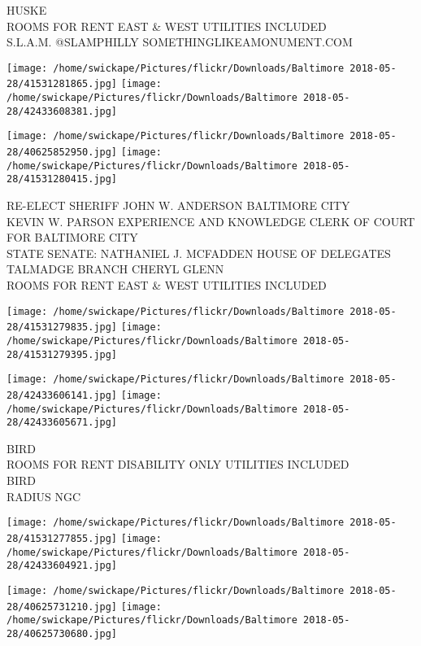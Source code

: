 \documentclass[10pt,letterpaper]{article}
\begin{document}
HUSKE\\
ROOMS FOR RENT EAST \& WEST UTILITIES INCLUDED\\
S.L.A.M. @SLAMPHILLY SOMETHINGLIKEAMONUMENT.COM\\
\pagebreak

\texttt{[image: /home/swickape/Pictures/flickr/Downloads/Baltimore 2018-05-28/41531281865.jpg]}
\texttt{[image: /home/swickape/Pictures/flickr/Downloads/Baltimore 2018-05-28/42433608381.jpg]}

\texttt{[image: /home/swickape/Pictures/flickr/Downloads/Baltimore 2018-05-28/40625852950.jpg]}
\texttt{[image: /home/swickape/Pictures/flickr/Downloads/Baltimore 2018-05-28/41531280415.jpg]}

RE{-}ELECT SHERIFF JOHN W. ANDERSON BALTIMORE CITY\\
KEVIN W. PARSON EXPERIENCE AND KNOWLEDGE CLERK OF COURT FOR BALTIMORE CITY\\
STATE SENATE: NATHANIEL J. MCFADDEN HOUSE OF DELEGATES TALMADGE BRANCH CHERYL GLENN\\
ROOMS FOR RENT EAST \& WEST UTILITIES INCLUDED\\
\pagebreak

\texttt{[image: /home/swickape/Pictures/flickr/Downloads/Baltimore 2018-05-28/41531279835.jpg]}
\texttt{[image: /home/swickape/Pictures/flickr/Downloads/Baltimore 2018-05-28/41531279395.jpg]}

\texttt{[image: /home/swickape/Pictures/flickr/Downloads/Baltimore 2018-05-28/42433606141.jpg]}
\texttt{[image: /home/swickape/Pictures/flickr/Downloads/Baltimore 2018-05-28/42433605671.jpg]}

BIRD\\
ROOMS FOR RENT DISABILITY ONLY UTILITIES INCLUDED\\
BIRD\\
RADIUS NGC\\
\pagebreak

\texttt{[image: /home/swickape/Pictures/flickr/Downloads/Baltimore 2018-05-28/41531277855.jpg]}
\texttt{[image: /home/swickape/Pictures/flickr/Downloads/Baltimore 2018-05-28/42433604921.jpg]}

\texttt{[image: /home/swickape/Pictures/flickr/Downloads/Baltimore 2018-05-28/40625731210.jpg]}
\texttt{[image: /home/swickape/Pictures/flickr/Downloads/Baltimore 2018-05-28/40625730680.jpg]}
\end{document}
